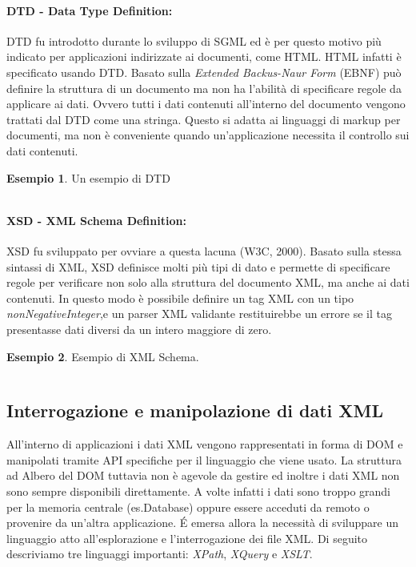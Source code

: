 \documentclass[12pt,a4paper,openright,twoside]{report}
\theoremstyle{definition}
\newtheorem{example}{Esempio}[]
\begin{document}
\paragraph{DTD - Data Type Definition:}DTD fu introdotto durante lo sviluppo di SGML ed è per questo motivo più indicato per applicazioni indirizzate ai documenti, come HTML. HTML infatti è specificato usando DTD. Basato sulla \emph{Extended Backus-Naur Form} (EBNF) può definire la struttura di un documento ma non ha l'abilità di specificare regole da applicare ai dati. Ovvero tutti i dati contenuti all'interno del documento vengono trattati dal DTD come una stringa. Questo si adatta ai linguaggi di markup per documenti, ma non è conveniente quando un'applicazione necessita il controllo sui dati contenuti.
\begin{example}
Un esempio di DTD\\
\inputminted[linenos,frame=lines]{dtd}{esempio1.dtd}
\label{lst:dtd_example}
\end{example}

\newpage
\paragraph{XSD - XML Schema Definition:}XSD fu sviluppato per ovviare a questa lacuna (W3C, 2000). Basato sulla stessa sintassi di XML, XSD definisce molti più tipi di dato e permette di specificare regole per verificare non solo alla struttura del documento XML, ma anche ai dati contenuti. In questo modo è possibile definire un tag XML con un tipo \emph{nonNegativeInteger},e un parser XML validante restituirebbe un errore se il tag presentasse dati diversi da un intero maggiore di zero.

\begin{example}
Esempio di XML Schema.
\inputminted[linenos,frame=lines]{xml}{esempio1.xsd}
\label{lst:xsd_example}
\end{example}

\subsection{Interrogazione e manipolazione di dati XML}
All'interno di applicazioni i dati XML vengono rappresentati in forma di DOM e manipolati tramite API specifiche per il linguaggio che viene usato. La struttura ad Albero del DOM tuttavia non è agevole da gestire ed inoltre i dati XML non sono sempre disponibili direttamente. A volte infatti i dati sono troppo grandi per la memoria centrale (es.Database) oppure essere acceduti da remoto o provenire da un'altra applicazione. \'{E} emersa allora la necessità di sviluppare un linguaggio atto all'esplorazione e l'interrogazione dei file XML. Di seguito descriviamo tre linguaggi importanti: \emph{XPath}, \emph{XQuery} e \emph{XSLT}.
\end{document}
